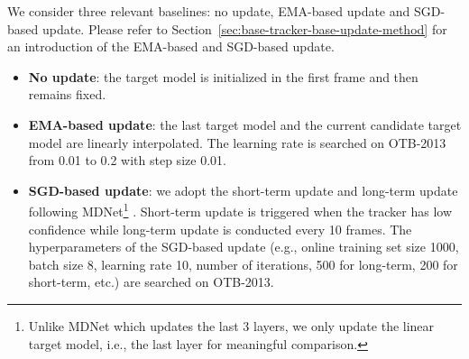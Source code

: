 \documentclass[journal]{IEEEtran}
\begin{document}
\begin{table}[]
	\centering
	\caption{Comparisons with three representative baselines: no update, EMA-based update and SGD-based update. The AUC and EAO metric (higher is better) are reported for OTB and VOT, respectively. For OTB only, the feature extractors are trained with both color and grayscale images. \label{table:baseline-comparison}}
\end{table}

We consider three relevant baselines: no update, EMA-based update and SGD-based update. Please refer to Section~\ref{sec:base-tracker-base-update-method} for an introduction of the EMA-based and SGD-based update. 
\begin{itemize}
	\item \textbf{No update}: the target model is initialized in the first frame and then remains fixed.
	\item \textbf{EMA-based update}: the last target model and the current candidate target model are linearly interpolated. The learning rate  is searched on OTB-2013 from 0.01 to 0.2 with step size 0.01.
	\item \textbf{SGD-based update}: we adopt the short-term update and long-term update following MDNet\footnote{Unlike MDNet which updates the last 3 layers, we only update the linear target model, i.e., the last layer for meaningful comparison.} \cite{Nam2016LearningMC}. Short-term update is triggered when the tracker has low confidence while long-term update is conducted every 10 frames. The hyperparameters of the SGD-based update (e.g., online training set size 1000, batch size 8, learning rate 10, number of iterations, 500 for long-term, 200 for short-term, etc.) are searched on OTB-2013.
\end{itemize}
\end{document}
